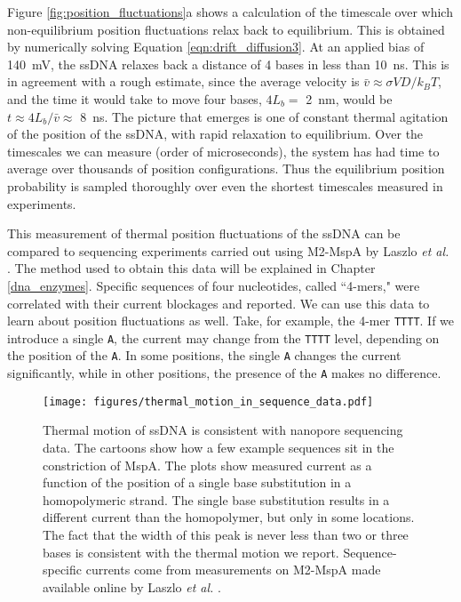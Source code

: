 Figure \ref{fig:position_fluctuations}a shows a calculation of the timescale over which non-equilibrium position fluctuations relax back to equilibrium.  This is obtained by numerically solving Equation \ref{eqn:drift_diffusion3}.  At an applied bias of \SI{140}{\mV}, the ssDNA relaxes back a distance of 4 bases in less than \SI{10}{\ns}.  This is in agreement with a rough estimate, since the average velocity is $\bar{v} \approx \sigma V D / k_B T$, and the time it would take to move four bases, $4 L_b = $ \SI{2}{\nm}, would be $t \approx 4 L_b / \bar{v} \approx $ \SI{8}{\ns}.  The picture that emerges is one of constant thermal agitation of the position of the ssDNA, with rapid relaxation to equilibrium.  Over the timescales we can measure (order of microseconds), the system has had time to average over thousands of position configurations.  Thus the equilibrium position probability is sampled thoroughly over even the shortest timescales measured in experiments.

This measurement of thermal position fluctuations of the ssDNA can be compared to sequencing experiments carried out using M2-MspA by Laszlo \textit{et al.} \citep{Laszlo2014}.  The method used to obtain this data will be explained in Chapter \ref{dna_enzymes}.  Specific sequences of four nucleotides, called ``4-mers," were correlated with their current blockages and reported.  We can use this data to learn about position fluctuations as well.  Take, for example, the 4-mer \texttt{TTTT}.  If we introduce a single \texttt{A}, the current may change from the \texttt{TTTT} level, depending on the position of the \texttt{A}.  In some positions, the single \texttt{A} changes the current significantly, while in other positions, the presence of the \texttt{A} makes no difference.

\begin{figure}[H] %
\begin{centering}
\texttt{[image: figures/thermal\_motion\_in\_sequence\_data.pdf]}
\caption[Thermal motion averaging in sequencing data]{Thermal motion of ssDNA is consistent with nanopore sequencing data.  The cartoons show how a few example sequences sit in the constriction of MspA.  The plots show measured current as a function of the position of a single base substitution in a homopolymeric strand.  The single base substitution results in a different current than the homopolymer, but only in some locations.  The fact that the width of this peak is never less than two or three bases is consistent with the thermal motion we report.  Sequence-specific currents come from measurements on M2-MspA made available online by Laszlo \textit{et al.} \citep{Laszlo2014}.}
\label{fig:thermal_motion_sequencing}
\end{centering}
\end{figure}

